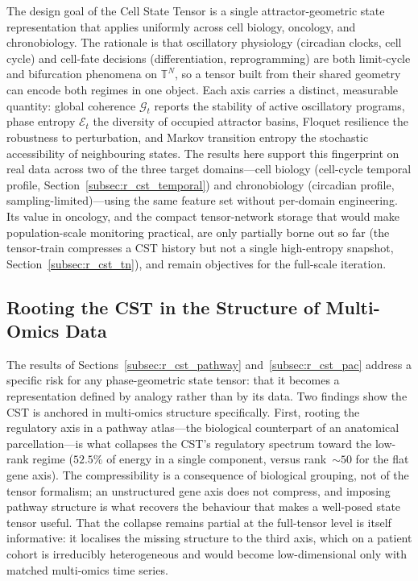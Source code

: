 \documentclass[preprint,12pt,amsmath,amssymb,superscriptaddress,floatfix]{revtex4-2}
\newcommand{\torus}{\mathbb{T}}
\begin{document}
The design goal of the Cell State Tensor is a single attractor-geometric state
representation that applies uniformly across cell biology, oncology, and
chronobiology. The rationale is that oscillatory physiology (circadian clocks,
cell cycle) and cell-fate decisions (differentiation, reprogramming) are both
limit-cycle and bifurcation phenomena on $\torus^N$, so a tensor built from
their shared geometry can encode both regimes in one object. Each axis carries
a distinct, measurable quantity: global coherence $\mathcal{G}_t$ reports the
stability of active oscillatory programs, phase entropy $\mathcal{E}_t$ the
diversity of occupied attractor basins, Floquet resilience the robustness to
perturbation, and Markov transition entropy the stochastic accessibility of
neighbouring states. The results here support this fingerprint on real data
across two of the three target domains---cell biology (cell-cycle temporal
profile, Section~\ref{subsec:r_cst_temporal}) and chronobiology (circadian
profile, sampling-limited)---using the same feature set without
per-domain engineering. Its value in oncology, and the compact
tensor-network storage that would make population-scale monitoring practical,
are only partially borne out so far (the tensor-train compresses a CST history
but not a single high-entropy snapshot, Section~\ref{subsec:r_cst_tn}), and
remain objectives for the full-scale iteration.

\subsection{Rooting the CST in the Structure of Multi-Omics Data}

The results of Sections~\ref{subsec:r_cst_pathway} and~\ref{subsec:r_cst_pac}
address a specific risk for any phase-geometric state tensor: that it becomes a
representation defined by analogy rather than by its data. Two findings show the
CST is anchored in multi-omics structure specifically. First, rooting the
regulatory axis in a pathway atlas---the biological counterpart of an anatomical
parcellation---is what collapses the CST's regulatory spectrum toward the
low-rank regime ($52.5\%$ of energy in a single component, versus rank~$\sim\!50$
for the flat gene axis). The compressibility is a consequence of biological
grouping, not of the tensor formalism; an unstructured gene axis does not
compress, and imposing pathway structure is what recovers the behaviour that
makes a well-posed state tensor useful. That the collapse remains partial at the
full-tensor level is itself informative: it localises the missing structure to
the third axis, which on a patient cohort is irreducibly heterogeneous and would
become low-dimensional only with matched multi-omics time series.
\end{document}

